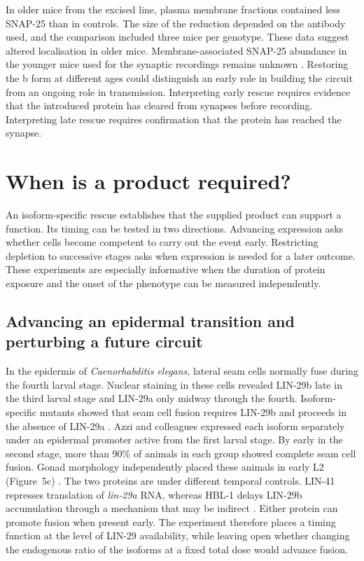 \documentclass[11pt,a4paper]{article}
\begin{document}
In older mice from the excised line, plasma membrane fractions contained less SNAP-25 than in controls. The size of the reduction depended on the antibody used, and the comparison included three mice per genotype. These data suggest altered localisation in older mice. Membrane-associated SNAP-25 abundance in the younger mice used for the synaptic recordings remains unknown \cite{Johansson2008}. Restoring the b form at different ages could distinguish an early role in building the circuit from an ongoing role in transmission. Interpreting early rescue requires evidence that the introduced protein has cleared from synapses before recording. Interpreting late rescue requires confirmation that the protein has reached the synapse.

\section{When is a product required?}

An isoform-specific rescue establishes that the supplied product can support a function. Its timing can be tested in two directions. Advancing expression asks whether cells become competent to carry out the event early. Restricting depletion to successive stages asks when expression is needed for a later outcome. These experiments are especially informative when the duration of protein exposure and the onset of the phenotype can be measured independently.

\subsection{Advancing an epidermal transition and perturbing a future circuit}

In the epidermis of \textit{Caenorhabditis elegans}, lateral seam cells normally fuse during the fourth larval stage. Nuclear staining in these cells revealed LIN-29b late in the third larval stage and LIN-29a only midway through the fourth. Isoform-specific mutants showed that seam cell fusion requires LIN-29b and proceeds in the absence of LIN-29a \cite{Azzi2020}. Azzi and colleagues expressed each isoform separately under an epidermal promoter active from the first larval stage. By early in the second stage, more than 90\% of animals in each group showed complete seam cell fusion. Gonad morphology independently placed these animals in early L2 (Figure~5c) \cite{Azzi2020}. The two proteins are under different temporal controls. LIN-41 represses translation of \textit{lin-29a} RNA, whereas HBL-1 delays LIN-29b accumulation through a mechanism that may be indirect \cite{Azzi2020}. Either protein can promote fusion when present early. The experiment therefore places a timing function at the level of LIN-29 availability, while leaving open whether changing the endogenous ratio of the isoforms at a fixed total dose would advance fusion.
\end{document}
